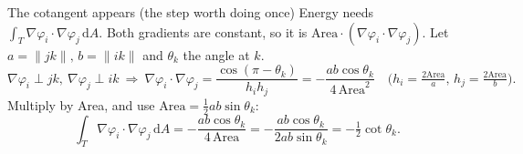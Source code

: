 \documentclass[aspectratio=169,10pt]{beamer}
\newcommand{\grad}{\nabla}
\newcommand{\half}{\tfrac{1}{2}}
\newcommand{\nm}[1]{\lVert #1\rVert}
\newcommand{\dd}{\mathrm{d}}
\begin{document}
\begin{frame}{The cotangent appears (the step worth doing once)}
  Energy needs $\displaystyle\int_T\grad\varphi_i\cdot\grad\varphi_j\,\dd A$. Both gradients are constant, so it is $\text{Area}\cdot(\grad\varphi_i\cdot\grad\varphi_j)$. Let $a=\nm{jk},\,b=\nm{ik}$ and $\theta_k$ the angle at $k$.
  \[
    \grad\varphi_i\perp jk,\ \grad\varphi_j\perp ik\ \Rightarrow\
    \grad\varphi_i\cdot\grad\varphi_j=\frac{\cos(\pi-\theta_k)}{h_i h_j}=-\frac{ab\cos\theta_k}{4\,\text{Area}^2}
    \quad\Big(h_i=\tfrac{2\text{Area}}{a},\,h_j=\tfrac{2\text{Area}}{b}\Big).
  \]
  Multiply by Area, and use $\text{Area}=\half ab\sin\theta_k$:
  \[
    \int_T\grad\varphi_i\cdot\grad\varphi_j\,\dd A=-\frac{ab\cos\theta_k}{4\,\text{Area}}
    =-\frac{ab\cos\theta_k}{2ab\sin\theta_k}=\boxed{-\half\cot\theta_k}.
  \]
\end{frame}
\end{document}
